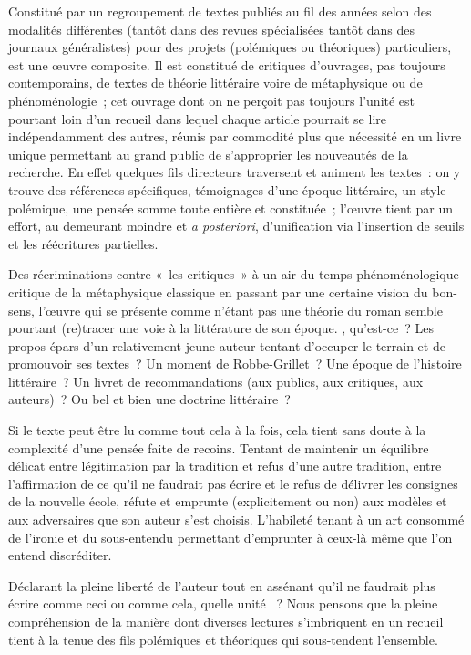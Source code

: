 \documentclass[12pt, a4paper]{article}
\begin{document}

Constitué par un regroupement de textes publiés au fil des années selon des modalités différentes (tantôt dans des revues spécialisées tantôt dans des journaux généralistes) pour des projets (polémiques ou théoriques) particuliers, \punr{} est une œuvre composite. Il est constitué de critiques d'ouvrages, pas toujours contemporains, de textes de théorie littéraire voire de métaphysique ou de phénoménologie~; cet ouvrage dont on ne perçoit pas toujours l'unité est pourtant loin d'un recueil dans lequel chaque article pourrait se lire indépendamment des autres, réunis par commodité plus que nécessité en un livre unique permettant au grand public de s'approprier les nouveautés de la recherche. En effet quelques fils directeurs traversent et animent les textes~: on y trouve des références spécifiques, témoignages d'une époque littéraire, un style polémique, une pensée somme toute entière et constituée~; l'œuvre tient par un effort, au demeurant moindre et \textit{a posteriori}, d'unification via l'insertion de seuils et les réécritures partielles.

Des récriminations contre «~les critiques~» à un air du temps phénoménologique critique de la métaphysique classique en passant par une certaine vision du bon-sens, l'œuvre qui se présente comme n'étant pas une théorie du roman semble pourtant (re)tracer une voie à la littérature de son époque. \punr, qu'est-ce~? Les propos épars d'un relativement jeune auteur tentant d'occuper le terrain et de promouvoir ses textes~? Un moment de Robbe-Grillet~? Une époque de l'histoire littéraire~? Un livret de recommandations (aux publics, aux critiques, aux auteurs)~? Ou bel et bien une doctrine littéraire~?

Si le texte peut être lu comme tout cela à la fois, cela tient sans doute à la complexité d'une pensée faite de recoins. Tentant de maintenir un équilibre délicat entre légitimation par la tradition et refus d'une autre tradition, entre l'affirmation de ce qu'il ne faudrait pas écrire et le refus de délivrer les consignes de la nouvelle école, \punr{} réfute et emprunte (explicitement ou non) aux modèles et aux adversaires que son auteur s'est choisis. L'habileté tenant à un art consommé de l'ironie et du sous-entendu permettant d'emprunter à ceux-là même que l'on entend discréditer.

Déclarant la pleine liberté de l'auteur tout en assénant qu'il ne faudrait plus écrire comme ceci ou comme cela, quelle unité \punr~? Nous pensons que la pleine compréhension de la manière dont diverses lectures s'imbriquent en un recueil tient à la tenue des fils polémiques et théoriques qui sous-tendent l'ensemble. 
\end{document}
